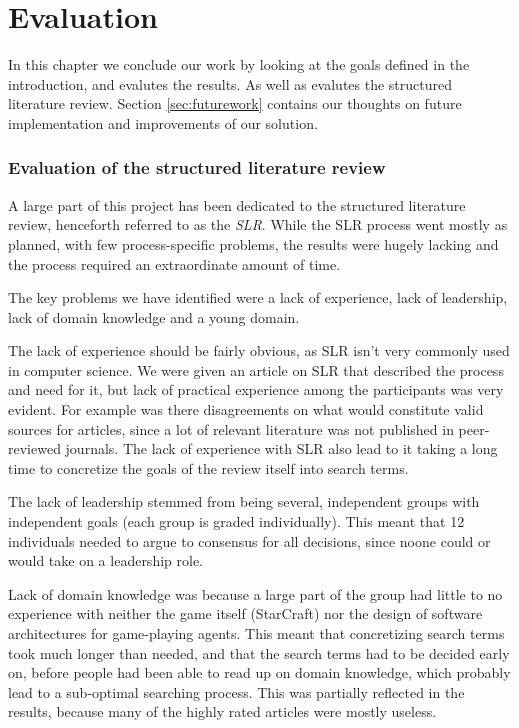 
\chapter{Evaluation}
In this chapter we conclude our work by looking at the goals defined in the introduction, and evalutes the results. As well as evalutes the structured literature review. Section \ref{sec:futurework} contains our thoughts on future implementation and improvements of our solution.

\subsection{Evaluation of the structured literature review}
A large part of this project has been dedicated to the structured literature
review, henceforth referred to as the \textit{SLR}. While the SLR process went
mostly as planned, with few process-specific problems, the results were hugely
lacking and the process required an extraordinate amount of time.

The key problems we have identified were a lack of experience, lack of
leadership, lack of domain knowledge and a young domain.

The lack of experience should be fairly obvious, as SLR isn't very commonly
used in computer science. We were given an article on SLR that described the
process and need for it, but lack of practical experience among the
participants was very evident. For example was there disagreements on what
would constitute valid sources for articles, since a lot of relevant literature
was not published in peer-reviewed journals. The lack of
experience with SLR also lead to it taking a long time to concretize the goals
of the review itself into search terms.

The lack of leadership stemmed from being several, independent groups with
independent goals (each group is graded individually). This meant that 12
individuals needed to argue to consensus for all decisions, since noone could
or would take on a leadership role.

Lack of domain knowledge was because a large part of the group had little to no
experience with neither the game itself (StarCraft) nor the design of software
architectures for game-playing agents. This meant that concretizing search
terms took much longer than needed, and that the search terms had to be
decided early on, before people had been able to read up on domain knowledge,
which probably lead to a sub-optimal searching process. This was partially
reflected in the results, because many of the highly rated articles were mostly
useless.

